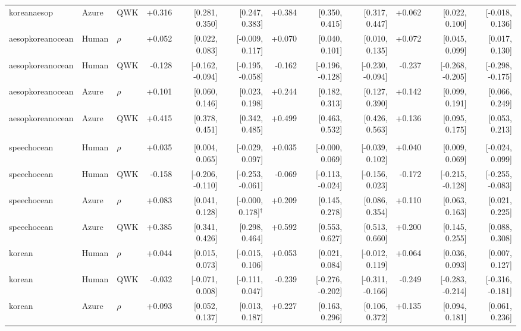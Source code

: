 \begin{landscape}
\begin{longtable}{@{}lllrrrrrrrrr@{}}
koreanaesop & Azure & QWK & +0.316 & [0.281, 0.350] & [0.247, 0.383] & +0.384 & [0.350, 0.415] & [0.317, 0.447] & +0.062 & [0.022, 0.100] & [-0.018, 0.136]\\
\addlinespace[2pt]
aesopkoreanocean & Human & $\rho$ & +0.052 & [0.022, 0.083] & [-0.009, 0.117] & +0.070 & [0.040, 0.101] & [0.010, 0.135] & +0.072 & [0.045, 0.099] & [0.017, 0.130]\\
aesopkoreanocean & Human & QWK & -0.128 & [-0.162, -0.094] & [-0.195, -0.058] & -0.162 & [-0.196, -0.128] & [-0.230, -0.094] & -0.237 & [-0.268, -0.205] & [-0.298, -0.175]\\
aesopkoreanocean & Azure & $\rho$ & +0.101 & [0.060, 0.146] & [0.023, 0.198] & +0.244 & [0.182, 0.313] & [0.127, 0.390] & +0.142 & [0.099, 0.191] & [0.066, 0.249]\\
aesopkoreanocean & Azure & QWK & +0.415 & [0.378, 0.451] & [0.342, 0.485] & +0.499 & [0.463, 0.532] & [0.426, 0.563] & +0.136 & [0.095, 0.175] & [0.053, 0.213]\\
\addlinespace[2pt]
\midrule\multicolumn{12}{l}{\textbf{H: 5-grid accuracy MAE}}\\*
speechocean & Human & $\rho$ & +0.035 & [0.004, 0.065] & [-0.029, 0.097] & +0.035 & [-0.000, 0.069] & [-0.039, 0.102] & +0.040 & [0.009, 0.069] & [-0.024, 0.099]\\
speechocean & Human & QWK & -0.158 & [-0.206, -0.110] & [-0.253, -0.061] & -0.069 & [-0.113, -0.024] & [-0.156, 0.023] & -0.172 & [-0.215, -0.128] & [-0.255, -0.083]\\
speechocean & Azure & $\rho$ & +0.083 & [0.041, 0.128] & [-0.000, 0.178]$^{\dagger}$ & +0.209 & [0.145, 0.278] & [0.086, 0.354] & +0.110 & [0.063, 0.163] & [0.021, 0.225]\\
speechocean & Azure & QWK & +0.385 & [0.341, 0.426] & [0.298, 0.464] & +0.592 & [0.553, 0.627] & [0.513, 0.660] & +0.200 & [0.145, 0.255] & [0.088, 0.308]\\
\addlinespace[2pt]
korean & Human & $\rho$ & +0.044 & [0.015, 0.073] & [-0.015, 0.106] & +0.053 & [0.021, 0.084] & [-0.012, 0.119] & +0.064 & [0.036, 0.093] & [0.007, 0.127]\\
korean & Human & QWK & -0.032 & [-0.071, 0.008] & [-0.111, 0.047] & -0.239 & [-0.276, -0.202] & [-0.311, -0.166] & -0.249 & [-0.283, -0.214] & [-0.316, -0.181]\\
korean & Azure & $\rho$ & +0.093 & [0.052, 0.137] & [0.013, 0.187] & +0.227 & [0.163, 0.296] & [0.106, 0.372] & +0.135 & [0.094, 0.181] & [0.061, 0.236]\\

\end{longtable}
\end{landscape}

